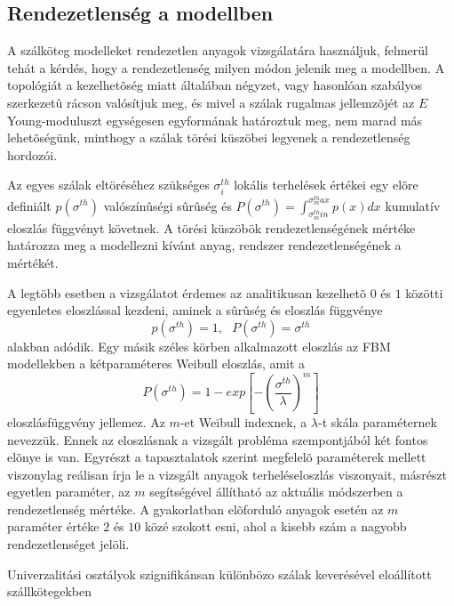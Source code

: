 \subsection{Rendezetlenség a modellben}
\par A szálköteg modelleket rendezetlen anyagok vizsgálatára használjuk,
felmerül tehát a kérdés, hogy a rendezetlenség milyen módon jelenik meg a modellben. A
topológiát a kezelhetõség miatt általában négyzet, vagy hasonlóan szabályos
szerkezetû rácson valósítjuk meg, és mivel a szálak rugalmas jellemzõjét az $E$
Young-moduluszt egységesen egyformának határoztuk meg, nem marad más
lehetõségünk, minthogy a szálak törési küszöbei legyenek a rendezetlenség
hordozói. 
\par Az egyes szálak eltöréséhez szükséges $\sigma_i^{th}$ lokális terhelések
értékei egy elõre definiált $p(\sigma^{th})$ valószínûségi sûrûség  és
$P(\sigma^{th})=\int_{\sigma^{th}_min}^{\sigma^{th}_max} p(x) dx$ kumulatív
eloszlás függvényt követnek. A törési küszöbök rendezetlenségének mértéke
határozza meg a modellezni kívánt anyag, rendszer rendezetlenségének a mértékét.
\par A legtöbb esetben a vizsgálatot érdemes az analitikusan kezelhetõ $0$ és
$1$ közötti egyenletes eloszlással kezdeni, aminek a sûrûség és eloszlás
függvénye
\begin{equation}
\label{equ:uniform1}
p(\sigma^{th})=1,\ \ \ P(\sigma^{th})=\sigma^{th}
\end{equation}
alakban adódik. Egy másik széles körben alkalmazott eloszlás az FBM modellekben
a kétparaméteres Weibull eloszlás, amit a
\begin{equation}
\label{equ:weibull1}
P(\sigma^{th})=1-exp\left[-\left(\frac{\sigma^{th}}{\lambda}\right)^m\right]
\end{equation}
eloszlásfüggvény jellemez. Az $m$-et Weibull indexnek, a $\lambda$-t skála
paraméternek nevezzük. Ennek az eloszlásnak a vizsgált probléma szempontjából
két fontos elõnye is van. Egyrészt a tapasztalatok szerint
megfelelõ paraméterek mellett viszonylag reálisan írja le a vizsgált
anyagok terheléseloszlás viszonyait, másrészt egyetlen paraméter, az $m$
segítségével állítható az aktuális módszerben a rendezetlenség mértéke. A
gyakorlatban elõforduló anyagok esetén az $m$ paraméter értéke $2$ és $10$ közé
szokott esni, ahol a kisebb szám a nagyobb rendezetlenséget jelöli. 




Univerzalitási osztályok szignifikánsan különbözo szálak keverésével eloállított szállkötegekben

